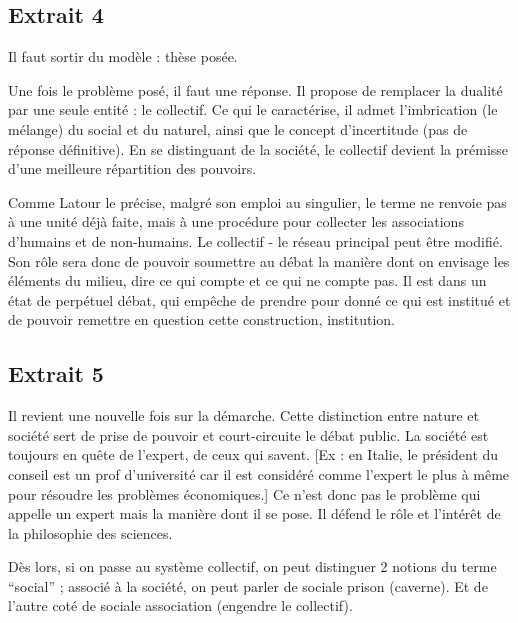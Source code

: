 \subsection{Extrait 4}

Il faut sortir du modèle : thèse posée.

Une fois le problème posé, il faut une réponse.
Il propose de remplacer la dualité par une seule entité : le collectif.
Ce qui le caractérise, il admet l'imbrication (le mélange) du social et du naturel, ainsi que le concept d'incertitude (pas de réponse définitive).
En se distinguant de la société, le collectif devient la prémisse d'une meilleure répartition des pouvoirs.

Comme Latour le précise, malgré son emploi au singulier, le terme ne renvoie pas à une unité déjà faite, mais à une procédure pour collecter les associations d'humains et de non-humains.
Le collectif - le réseau principal peut être modifié.
Son rôle sera donc de pouvoir soumettre au débat la manière dont on envisage les éléments du milieu, dire ce qui compte et ce qui ne compte pas.
Il est dans un état de perpétuel débat, qui empêche de prendre pour donné ce qui est institué et de pouvoir remettre en question cette construction, institution.

\subsection{Extrait 5}

Il revient une nouvelle fois sur la démarche.
Cette distinction entre nature et société sert de prise de pouvoir et court-circuite le débat public.
La société est toujours en quête de l'expert, de ceux qui savent.
[Ex : en Italie, le président du conseil est un prof d'université car il est considéré comme l'expert le plus à même pour résoudre les problèmes économiques.] Ce n'est donc pas le problème qui appelle un expert mais la manière dont il se pose.
Il défend le rôle et l'intérêt de la philosophie des sciences.

Dès lors, si on passe au système collectif, on peut distinguer 2 notions du terme  ``social'' ; associé à la société, on peut parler de sociale prison (caverne).
Et de l'autre coté de sociale association (engendre le collectif).

